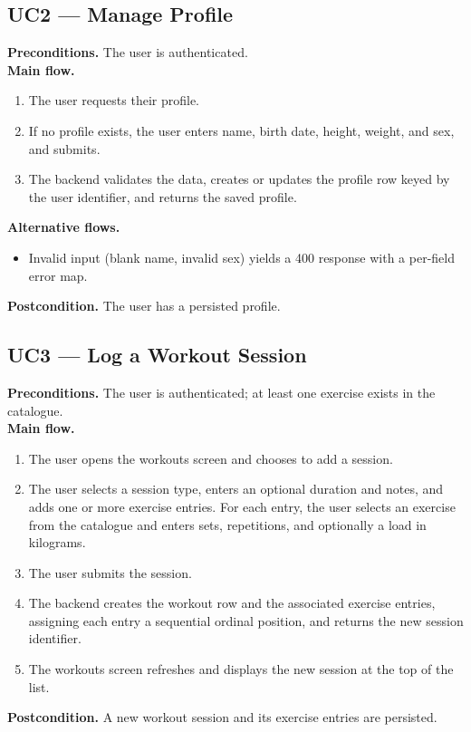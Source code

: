 \subsection{UC2 --- Manage Profile}
\label{subsec:uc2}

\textbf{Preconditions.} The user is authenticated.\\
\textbf{Main flow.}
\begin{enumerate}
    \item The user requests their profile.
    \item If no profile exists, the user enters name, birth date, height, weight, and sex, and submits.
    \item The backend validates the data, creates or updates the profile row keyed by the user identifier, and returns the saved profile.
\end{enumerate}
\textbf{Alternative flows.}
\begin{itemize}
    \item Invalid input (blank name, invalid sex) yields a 400 response with a per-field error map.
\end{itemize}
\textbf{Postcondition.} The user has a persisted profile.

\subsection{UC3 --- Log a Workout Session}
\label{subsec:uc3}

\textbf{Preconditions.} The user is authenticated; at least one exercise exists in the catalogue.\\
\textbf{Main flow.}
\begin{enumerate}
    \item The user opens the workouts screen and chooses to add a session.
    \item The user selects a session type, enters an optional duration and notes, and adds one or more exercise entries. For each entry, the user selects an exercise from the catalogue and enters sets, repetitions, and optionally a load in kilograms.
    \item The user submits the session.
    \item The backend creates the workout row and the associated exercise entries, assigning each entry a sequential ordinal position, and returns the new session identifier.
    \item The workouts screen refreshes and displays the new session at the top of the list.
\end{enumerate}
\textbf{Postcondition.} A new workout session and its exercise entries are persisted.

